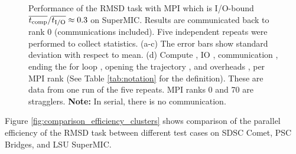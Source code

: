 \begin{figure}[ht!]
\caption{Performance of the RMSD task with MPI which is I/O-bound $\overline{{t}_{\text{comp}}}/\overline{{t}_{\text{I/O}}} \approx 0.3$ on SuperMIC.
Results are communicated back to rank 0 (communications included). Five independent repeats were performed to collect statistics. (a-c) The error bars show
standard deviation with respect to mean. (d) Compute \tcomp, IO \tIO, communication \tcomm, ending the for loop ,
  opening the trajectory , and overheads ,  per MPI rank (See Table \ref{tab:notation} for the definition).
These are data from one run of the five repeats. MPI ranks 0 and 70 are stragglers. \textbf{Note:} In serial, there is no communication.}
\label{fig:MPIwithIO-SuperMIC}
\end{figure} 

Figure \ref{fig:comparison_efficiency_clusters} shows comparison of the parallel efficiency of the RMSD task between different test cases on SDSC Comet, PSC Bridges, and LSU SuperMIC.  


